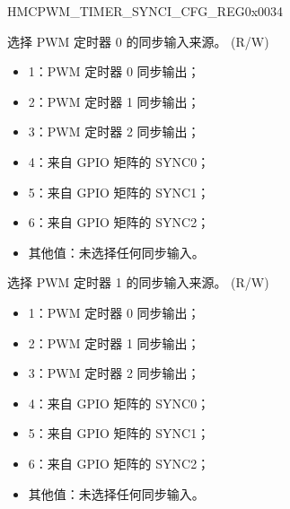 \begin{register}{H}{MCPWM\_TIMER\_SYNCI\_CFG\_REG}{0x{}0034}\label{regdesc:MCPWMTIMERSYNCICFGREG}
%
%
%
%
%
%
%
\regnewline%
\begin{regdesc}\begin{reglist}
\label{fielddesc:MCPWMTIMER0SYNCISEL}\item [MCPWM\_TIMER0\_SYNCISEL] 选择 PWM 定时器 0 的同步输入来源。 (R/W)
\begin{itemize}
    \item 1：PWM 定时器 0 同步输出；
    \item 2：PWM 定时器 1 同步输出；
    \item 3：PWM 定时器 2 同步输出；
    \item 4：来自 GPIO 矩阵的 SYNC0；
    \item 5：来自 GPIO 矩阵的 SYNC1；
    \item 6：来自 GPIO 矩阵的 SYNC2；
    \item 其他值：未选择任何同步输入。
\end{itemize}
\label{fielddesc:MCPWMTIMER1SYNCISEL}\item [MCPWM\_TIMER1\_SYNCISEL] 选择 PWM 定时器 1 的同步输入来源。 (R/W)
\begin{itemize}
    \item 1：PWM 定时器 0 同步输出；
    \item 2：PWM 定时器 1 同步输出；
    \item 3：PWM 定时器 2 同步输出；
    \item 4：来自 GPIO 矩阵的 SYNC0；
    \item 5：来自 GPIO 矩阵的 SYNC1；
    \item 6：来自 GPIO 矩阵的 SYNC2；
    \item 其他值：未选择任何同步输入。
\end{itemize}
\item [见下页]
\end{reglist}\end{regdesc}
\end{register}
\addtocounter{Regfloat}{-1}
